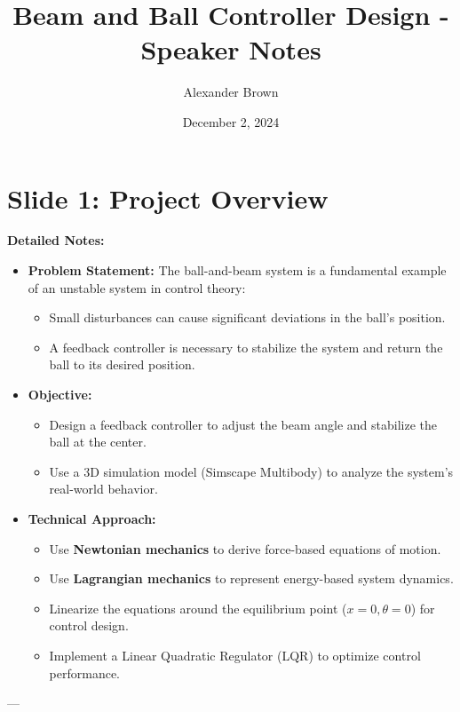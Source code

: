 \documentclass[12pt]{article}
\title{Beam and Ball Controller Design - Speaker Notes}
\author{Alexander Brown}
\date{December 2, 2024}
\begin{document}
\section*{Slide 1: Project Overview}
\textbf{Detailed Notes:}
\begin{itemize}
    \item \textbf{Problem Statement:} The ball-and-beam system is a fundamental example of an unstable system in control theory:
    \begin{itemize}
        \item Small disturbances can cause significant deviations in the ball's position.
        \item A feedback controller is necessary to stabilize the system and return the ball to its desired position.
    \end{itemize}
    \item \textbf{Objective:}
    \begin{itemize}
        \item Design a feedback controller to adjust the beam angle and stabilize the ball at the center.
        \item Use a 3D simulation model (Simscape Multibody) to analyze the system’s real-world behavior.
    \end{itemize}
    \item \textbf{Technical Approach:}
    \begin{itemize}
        \item Use \textbf{Newtonian mechanics} to derive force-based equations of motion.
        \item Use \textbf{Lagrangian mechanics} to represent energy-based system dynamics.
        \item Linearize the equations around the equilibrium point (\(x = 0, \theta = 0\)) for control design.
        \item Implement a Linear Quadratic Regulator (LQR) to optimize control performance.
    \end{itemize}
\end{itemize}

---
\newpage
\end{document}
